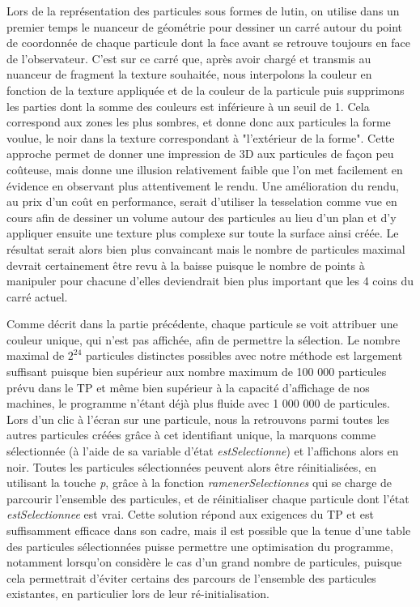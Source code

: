 Lors de la représentation des particules sous formes de lutin, on utilise dans un premier temps le nuanceur de géométrie pour dessiner un carré autour du point de coordonnée de chaque particule dont la face avant se retrouve toujours en face de l'observateur.
C'est sur ce carré que, après avoir chargé et transmis au nuanceur de fragment la texture souhaitée, nous interpolons la couleur en fonction de la texture appliquée et de la couleur de la particule puis supprimons les parties dont la somme des couleurs est inférieure à un seuil de 1.
Cela correspond aux zones les plus sombres, et donne donc aux particules la forme voulue, le noir dans la texture correspondant à "l'extérieur de la forme".
Cette approche permet de donner une impression de 3D aux particules de façon peu coûteuse, mais donne une illusion relativement faible que l'on met facilement en évidence en observant plus attentivement le rendu. Une amélioration du rendu, au prix d'un coût en performance, serait d'utiliser la tesselation comme vue en cours afin de dessiner un volume autour des particules au lieu d'un plan et d'y appliquer ensuite une texture plus complexe sur toute la surface ainsi créée.
Le résultat serait alors bien plus convaincant mais le nombre de particules maximal devrait certainement être revu à la baisse puisque le nombre de points à manipuler pour chacune d'elles deviendrait bien plus important que les 4 coins du carré actuel.

Comme décrit dans la partie précédente, chaque particule se voit attribuer une couleur unique, qui n'est pas affichée, afin de permettre la sélection. Le nombre maximal de \begin{math}2^24\end{math} particules distinctes possibles avec notre méthode est largement suffisant puisque bien supérieur aux nombre maximum de 100 000 particules prévu dans le TP et même bien supérieur à la capacité d'affichage de nos machines, le programme n'étant déjà plus fluide avec 1 000 000 de particules.
Lors d'un clic à l'écran sur une particule, nous la retrouvons parmi toutes les autres particules créées grâce à cet identifiant unique, la marquons comme sélectionnée (à l'aide de sa variable d'état \textit{estSelectionne}) et l'affichons alors en noir.
Toutes les particules sélectionnées peuvent alors être réinitialisées, en utilisant la touche \textit{p}, grâce à la fonction \textit{ramenerSelectionnes} qui se charge de parcourir l'ensemble des particules, et de réinitialiser chaque particule dont l'état \textit{estSelectionnee} est vrai.
Cette solution répond aux exigences du TP et est suffisamment efficace dans son cadre, mais il est possible que la tenue d'une table des particules sélectionnées puisse permettre une optimisation du programme, notamment lorsqu'on considère le cas d'un grand nombre de particules, puisque cela permettrait d'éviter certains des parcours de l'ensemble des particules existantes, en particulier lors de leur ré-initialisation.